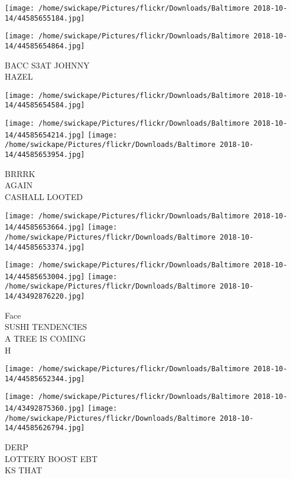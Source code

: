 \documentclass[10pt,letterpaper]{article}
\begin{document}
\texttt{[image: /home/swickape/Pictures/flickr/Downloads/Baltimore 2018-10-14/44585655184.jpg]}

\vspace{0.25in}
\texttt{[image: /home/swickape/Pictures/flickr/Downloads/Baltimore 2018-10-14/44585654864.jpg]}

BACC S3AT JOHNNY\\
HAZEL\\
\pagebreak

\texttt{[image: /home/swickape/Pictures/flickr/Downloads/Baltimore 2018-10-14/44585654584.jpg]}

\vspace{0.25in}
\texttt{[image: /home/swickape/Pictures/flickr/Downloads/Baltimore 2018-10-14/44585654214.jpg]}
\texttt{[image: /home/swickape/Pictures/flickr/Downloads/Baltimore 2018-10-14/44585653954.jpg]}

BRRRK\\
AGAIN\\
CASHALL LOOTED\\
\pagebreak

\texttt{[image: /home/swickape/Pictures/flickr/Downloads/Baltimore 2018-10-14/44585653664.jpg]}
\texttt{[image: /home/swickape/Pictures/flickr/Downloads/Baltimore 2018-10-14/44585653374.jpg]}

\texttt{[image: /home/swickape/Pictures/flickr/Downloads/Baltimore 2018-10-14/44585653004.jpg]}
\texttt{[image: /home/swickape/Pictures/flickr/Downloads/Baltimore 2018-10-14/43492876220.jpg]}

Face\\
SUSHI TENDENCIES\\
A TREE IS COMING\\
H\\
\pagebreak

\texttt{[image: /home/swickape/Pictures/flickr/Downloads/Baltimore 2018-10-14/44585652344.jpg]}

\vspace{0.25in}
\texttt{[image: /home/swickape/Pictures/flickr/Downloads/Baltimore 2018-10-14/43492875360.jpg]}
\texttt{[image: /home/swickape/Pictures/flickr/Downloads/Baltimore 2018-10-14/44585626794.jpg]}

DERP\\
LOTTERY BOOST EBT\\
KS THAT\\
\pagebreak
\end{document}
